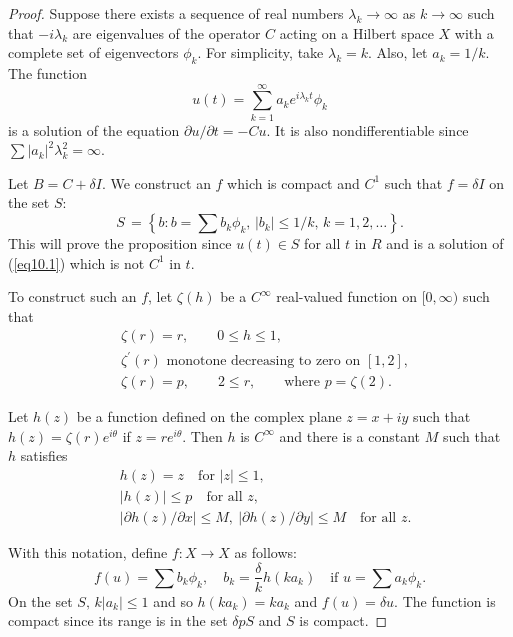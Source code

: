 \documentclass{surv-l}
\theoremstyle{plain}
\theoremstyle{definition}
\numberwithin{equation}{section}
\numberwithin{figure}{chapter}
\begin{document}
\begin{proof} Suppose there exists a sequence of real numbers $\lambda_{k}\rightarrow\infty$ as $ k\rightarrow\infty$ such that $-i\lambda_{k}$ are eigenvalues of the operator $C$ acting on a Hilbert space $X$ with a complete set of eigenvectors $\phi_{k}$. For simplicity, take $\lambda_{k}=k$. Also, let $a_{k}=1/k$. The function
\begin{equation*}
u(t)=\sum_{k=1}^{\infty}a_{k}e^{i\lambda_{k}t}\phi_{k}
\end{equation*}
is a solution of the equation $\partial u/\partial t=-Cu$. It is also nondifferentiable since $\sum|a_{k}|^{2}\lambda_{k}^{2}=\infty$.

Let $B=C+\delta I$. We construct an $f$ which is compact and $C^{1}$ such that $f=\delta I$ on the set $S$:
\begin{equation*}
S\,=\left\{b\!:b=\sum b_{k}\phi_{k},\, |b_{k}|\leq 1/k,\, k=1,2,\ldots\right\}.
\end{equation*}
This will prove the proposition since $u(t)\in S$ for all $t$ in $R$ and is a solution of (\ref{eq10.1}) which is not $C^{1}$ in $t$.

To construct such an $f$, let $\zeta(h)$ be a $C^{\infty}$ real-valued function on $[0, \infty)$ such that
\begin{align*}
&\zeta(r)=r,\qquad 0\leq h\leq 1,\\
&\zeta^{\prime}(r)\text{ monotone decreasing to zero on } [1, 2],\\
&\zeta(r)=p,\qquad 2\leq r,\qquad \text{where } p=\zeta(2).
\end{align*}


Let $h(z)$ be a function defined on the complex plane $z=x+iy$ such that $h(z)=\zeta(r)e^{i\theta}$ if $z =re^{i\theta}$. Then $h$ is $C^{\infty}$ and there is a constant $M$ such that $h$ satisfies
\begin{align*}
&h(z) =z\quad \text{for } |z|\leq 1,\\
&|h(z)|\leq p\quad \text{for all } z,\\
&|\partial h(z)/\partial x|\leq M,\ |\partial h(z)/\partial y|\leq M\quad \text{for all } z.
\end{align*}

With this notation, define $f\!:X\rightarrow X$ as follows:
\begin{equation*}
f(u)=\sum b_{k}\phi_{k},\quad b_{k}=\frac{\delta}{k}h(ka_{k})\quad \text{if } u=\sum a_{k}\phi_{k}.
\end{equation*}
On the set $S,\, k|a_{k}|\leq 1$ and so $h(ka_{k})=ka_{k}$ and $f(u)=\delta u$. The function is compact since its range is in the set $\delta pS$ and $S$ is compact.


\end{proof}
\end{document}
